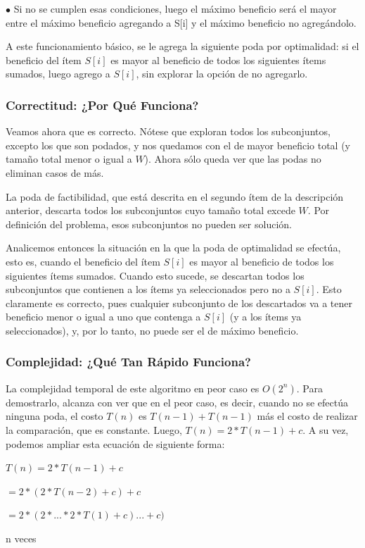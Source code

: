 \documentclass[a4paper]{article}
\begin{document}
$\bullet$ Si no se cumplen esas condiciones, luego el máximo beneficio será el mayor entre el máximo beneficio agregando a S[i] y el máximo beneficio no agregándolo. 

A este funcionamiento básico, se le agrega la siguiente poda por optimalidad: si el beneficio del ítem $S[i]$ es mayor al beneficio de todos los siguientes ítems sumados, luego agrego a $S[i]$, sin explorar la opción de no agregarlo. 


\subsubsection{Correctitud: ¿Por Qué Funciona?}

Veamos ahora que es correcto. Nótese que exploran todos los subconjuntos, excepto los que son podados, y nos quedamos con el de mayor beneficio total (y tamaño total menor o igual a $W$). Ahora sólo queda ver que las podas no eliminan casos de más.

La poda de factibilidad, que está descrita en el segundo ítem de la descripción anterior, descarta todos los subconjuntos cuyo tamaño total excede $W$. Por definición del problema, esos subconjuntos no pueden ser solución.

Analicemos entonces la situación en la que la poda de optimalidad se efectúa, esto es, cuando el beneficio del ítem $S[i]$ es mayor al beneficio de todos los siguientes ítems sumados. Cuando esto sucede, se descartan todos los subconjuntos que contienen a los ítems ya seleccionados pero no a $S[i]$. Esto claramente es correcto, pues cualquier subconjunto de los descartados va a tener beneficio menor o igual a uno que contenga a $S[i]$ (y a los ítems ya seleccionados), y, por lo tanto, no puede ser el de máximo beneficio.


\subsubsection{Complejidad: ¿Qué Tan Rápido Funciona?}

La complejidad temporal de este algoritmo en peor caso es $O(2^n)$. Para demostrarlo, alcanza con ver que en el peor caso, es decir, cuando no se efectúa ninguna poda, el costo $T(n)$ es  $T(n-1)+T(n-1)$ más el costo de realizar la comparación, que es constante. Luego, $T(n) = 2 * T(n-1) + c $.  A su vez, podemos ampliar esta ecuación de siguiente forma:

\quad
\begin{center}
    

$T(n) = 2 * T(n-1) + c $

\hspace{2.2cm}$= 2 * (2 * T(n-2)+c)+c$

\hspace{3cm}$= 2 * (2 * ... * 2* T(1)+c) ... + c)$

\hspace{1.2cm}n veces



\end{center}
\quad
\end{document}
